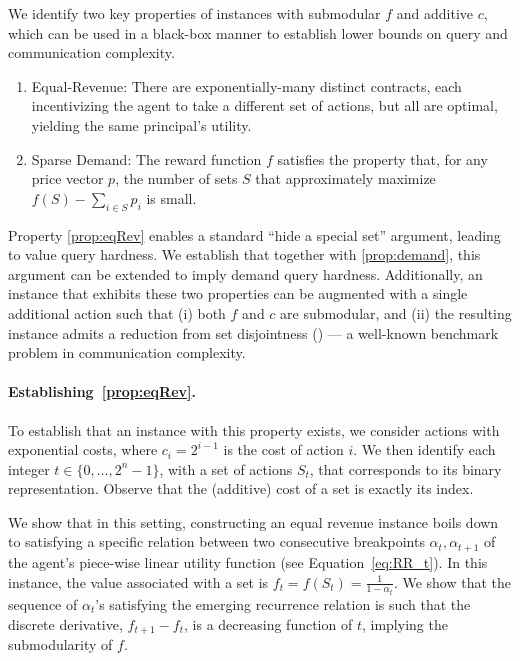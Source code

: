 \documentclass[11pt]{article}
\begin{document}
We identify two key properties of instances with submodular $f$ and additive $c$, which can be used in a black-box manner to establish 
lower bounds on query and communication complexity.
\begin{enumerate}[label=\textbf{P.\arabic*}]
    \setlength\itemsep{-0.25em}
    \item\label{prop:eqRev} Equal-Revenue: There are exponentially-many distinct contracts, each incentivizing the agent 
    to take a different set of actions, 
    but all are optimal, yielding the same principal's utility.
    \item\label{prop:demand} Sparse Demand: The reward function $f$ satisfies the property that, for any price vector $p$, the number of sets $S$ that approximately maximize $f(S) - \sum_{i \in S} p_i$ is small.
\end{enumerate}
Property \ref{prop:eqRev} enables a standard ``hide a special set'' argument, leading to value query hardness. We establish that together with \ref{prop:demand}, this argument can be extended to imply demand query hardness. 
Additionally, an instance that exhibits these two properties can be augmented with a single additional action such that (i) both $f$ and $c$ are submodular, and (ii) the resulting instance admits a reduction from set disjointness () --- a well-known benchmark problem in communication complexity.

\paragraph{Establishing~\ref{prop:eqRev}.}
To establish that an instance with this property exists, we consider actions with exponential costs, where $c_i = 2^{i-1}$ is the cost of action $i$. 
We then identify each integer $t \in \{0,\dots,2^n-1\}$, with a set of actions $S_t$, that corresponds to its binary representation. Observe that the (additive) cost of a set is exactly its index.

We show that in this setting, constructing an equal revenue instance boils down to satisfying a specific relation between two consecutive breakpoints $\alpha_t, \alpha_{t+1}$ of the agent's piece-wise linear utility function (see Equation~\eqref{eq:RR_t}).
In this instance, the value associated with a set is $f_t = f(S_t) = \frac{1}{1-\alpha_t}$. 
We show that the sequence of $\alpha_t$'s satisfying the emerging recurrence relation is such that the discrete derivative, $f_{t+1}-f_t$, is a decreasing function of $t$, implying the submodularity of $f$.
\end{document}
